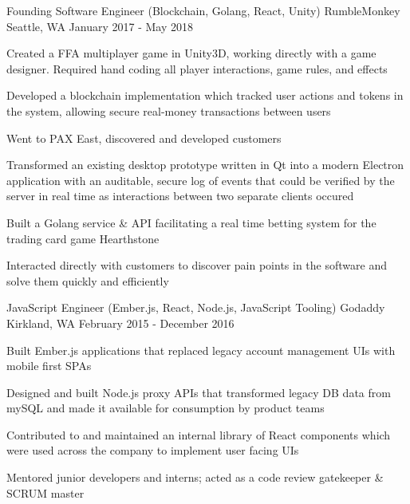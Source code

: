 \begin{cventries}
  \cventry
    {Founding Software Engineer (Blockchain, Golang, React, Unity)} %
    {RumbleMonkey} %
    {Seattle, WA} %
    {January 2017 - May 2018} %
    {
      \begin{cvitems} %
        \item {Created a FFA multiplayer game in Unity3D, working directly with a game designer. Required hand coding all player interactions, game rules, and effects}
        \item {Developed a blockchain implementation which tracked user actions and tokens in the system, allowing secure real-money transactions between users}
        \item {Went to PAX East, discovered and developed customers}
        \item {Transformed an existing desktop prototype written in Qt into a modern Electron application with an auditable, secure log of events that could be verified by the server in real time as interactions between two separate clients occured}
        \item {Built a Golang service \& API facilitating a real time betting system for the trading card game Hearthstone}
        \item {Interacted directly with customers to discover pain points in the software and solve them quickly and efficiently}
      \end{cvitems}
    }

  \cventry
    {JavaScript Engineer (Ember.js, React, Node.js, JavaScript Tooling)} %
    {Godaddy} %
    {Kirkland, WA} %
    {February 2015 - December 2016} %
    {
      \begin{cvitems} %
        \item {Built Ember.js applications that replaced legacy account management UIs with mobile first SPAs}
        \item {Designed and built Node.js proxy APIs that transformed legacy DB data from mySQL and made it available for consumption by product teams}
        \item {Contributed to and maintained an internal library of React components which were used across the company to implement user facing UIs}
        \item {Mentored junior developers and interns; acted as a code review gatekeeper \& SCRUM master}
      \end{cvitems}
    }


\end{cventries}
